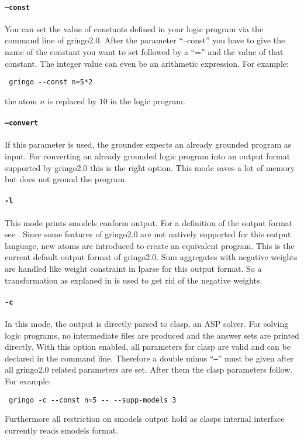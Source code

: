 \documentclass[a4paper,10pt]{article}
\begin{document}
\paragraph{\texttt{--const}}
You can set the value of constants defined in your logic program via the command line of gringo2.0.
After the parameter ``--const'' you have to give the name of the constant you want to set followed by a ``='' and the value of that constant. The integer value can even be an arithmetic expression. For example:
\begin{verbatim}
 gringo --const n=5*2
\end{verbatim}
the atom $n$ is replaced by $10$ in the logic program.

\paragraph{\texttt{--convert}}
If this parameter is used, the grounder expects an already grounded program as input.
For converting an already grounded logic program into an output format supported by gringo2.0 this is the right option. This mode saves a lot of memory but does not ground the program.
\paragraph{\texttt{-l}}
This mode prints smodels conform output. For a definition of the output format see \cite{lparseManual}.
Since some features of gringo2.0 are not natively supported for this output language, new atoms are introduced to create an equivalent program.\newline
This is the current default output format of gringo2.0.
Sum aggregates with negative weights are handled like weight constraint in lparse for this output format. So a transformation as explaned in \cite{lparseManual} is used to get rid of the negative weights.
\paragraph{\texttt{-c}}
In this mode, the output is directly parsed to clasp, an ASP solver. For solving logic programs, no intermediate files are produced and the answer sets are printed directly.
With this option enabled, all parameters for clasp are valid and can be declared in the command line. Therefore a double minus ``\texttt{--}'' must be given after all gringo2.0 related parameters are set. After them the clasp parameters follow.
For example:
\begin{verbatim}
 gringo -c --const n=5 -- --supp-models 3
\end{verbatim}
Furthermore all restriction on smodels output hold as clasps internal interface currently reads smodels format.
\end{document}
